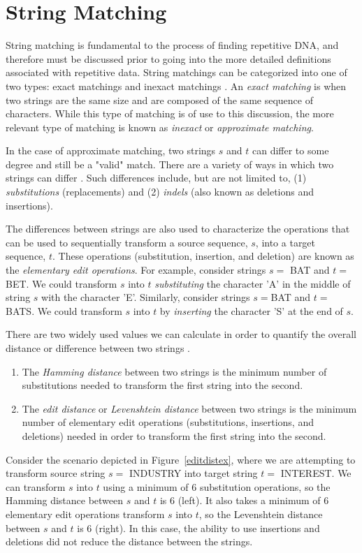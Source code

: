 \section{String Matching}
String matching is fundamental to the process of finding repetitive DNA, and therefore must be discussed prior to  going into the more detailed definitions associated with repetitive data. String matchings can be categorized into one of two types: exact matchings and inexact matchings \cite{gusfield1997algorithms}. An \textit{exact matching} is when two strings are the same size and are composed of the same sequence of characters. While this type of matching is of use to this discussion, the more relevant type of matching is known as \textit{inexact} or \textit{approximate matching}. 

In the case of approximate matching, two strings $s$ and $t$ can differ to some degree and still be a "valid" match. There are a variety of ways in which two strings can differ \cite{kruskal1983an-overview}. Such differences include, but are not limited to, (1) \textit{substitutions} (replacements) and (2) \textit{indels} (also known as deletions and insertions). 

The differences between strings are also used to characterize the operations that can be used to sequentially transform a source sequence, $s$, into a target sequence, $t$. These operations (substitution, insertion, and deletion) are known as the \textit{elementary edit operations}. For example, consider strings $s=$ BAT and $t=$ BET. We could transform $s$ into $t$ \textit{substituting} the character 'A' in the middle of string $s$ with the character 'E'. Similarly, consider strings $s=$BAT and $t=$BATS. We could transform $s$ into $t$ by \textit{inserting} the character 'S' at the end of $s$.

 There are two widely used values we can calculate in order to quantify the overall distance or difference between two strings \cite{kruskal1983an-overview}. 
 \begin{enumerate}
 \item{The \textit{Hamming distance} between two strings is the minimum number of substitutions needed to transform the first string into the second.}
 \item{The \textit{edit distance} or \textit{Levenshtein distance} \cite{levenshtein1966binary} between two strings is the minimum number of elementary edit operations (substitutions, insertions, and deletions) needed in order to transform the first string into the second.}
 \end{enumerate}
Consider the scenario depicted in Figure~\ref{editdistex}, where we are attempting to transform source string $s=$ INDUSTRY into target string $t=$ INTEREST. We can transform $s$ into $t$ using a minimum of 6 substitution operations, so the Hamming distance between $s$ and $t$ is 6 (left). It also takes a minimum of 6 elementary edit operations  transform $s$ into $t$, so the Levenshtein distance between $s$ and $t$ is 6 (right). In this case, the ability to use insertions and deletions did not reduce the distance between the strings.

